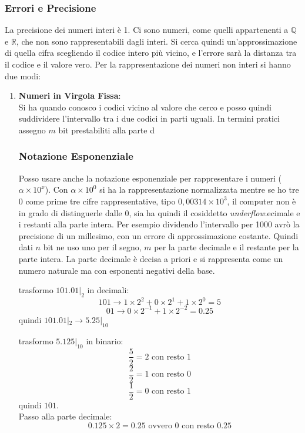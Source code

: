 \documentclass[a4paper,12pt, oneside]{book}
\begin{document}
\subsubsection{Errori e Precisione}
La precisione dei numeri interi è 1. Ci sono numeri, come quelli appartenenti a $\mathbb{Q}$ e $\mathbb{R}$, che non sono rappresentabili dagli interi. Si cerca quindi un'approssimazione di quella cifra scegliendo il codice intero più vicino, e l'errore sarà la distanza tra il codice e il valore vero.
Per la rappresentazione dei numeri non interi si hanno due modi:
\begin{enumerate}
\item \textbf{Numeri in Virgola Fissa}:\\
Si ha quando conosco i codici vicino al valore che cerco e posso quindi suddividere l'intervallo tra i due codici in parti uguali. In termini pratici assegno $m$ bit prestabiliti alla parte d\subsubsection{Notazione Esponenziale}
Posso usare anche la notazione esponenziale per rappresentare i numeri ($\alpha\times 10^x$). Con $\alpha\times 10^0$ si ha la rappresentazione normalizzata mentre se ho tre $0$ come prime tre cifre rappresentative, tipo $0,00314\times 10^3$, il computer non è in grado di distinguerle dalle $0$, sia ha quindi il cosiddetto \textit{underflow}.ecimale e i restanti alla parte intera. Per esempio dividendo l'intervallo per 1000 avrò la precisione di un millesimo, con un errore di approssimazione costante. Quindi dati $n$ bit ne uso uno per il segno, $m$ per la parte decimale e il restante per la parte intera. La parte decimale è decisa a priori e si rappresenta come un numero naturale ma con esponenti negativi della base.
\begin{esempio}
trasformo $101.01|_{2}$ in decimali:\\
$$101 \rightarrow 1\times 2^2+ 0\times 2^1+1 \times 2^0=5$$
$$01\rightarrow 0\times 2^{-1}+1\times 2^{-2}=0.25$$
quindi $101.01|_{2}\rightarrow 5.25|_{10}$
\end{esempio}
\begin{esempio}
trasformo $5.125|_{10}$ in binario:\\
$$\frac{5}{2}=2 \mbox{ con resto } 1$$
$$\frac{2}{2}=1 \mbox{ con resto } 0$$
$$\frac{1}{2}=0 \mbox{ con resto } 1$$
quindi $101$.\\ 
Passo alla parte decimale:\\
$$0.125\times 2 = 0.25 \mbox{ ovvero } 0 \mbox{ con resto } 0.25$$

\end{esempio}
\end{enumerate}
\end{document}

